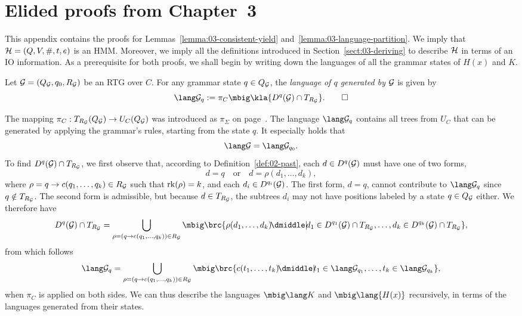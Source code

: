 \section{Elided proofs from Chapter~3}\label{sec:appendix-hk-proofs}

This appendix contains the proofs for Lemmas~\ref{lemma:03-consistent-yield}
and~\ref{lemma:03-language-partition}. We imply that $\mathcal H = (Q,V,\#,t,e)$ is an
HMM. Moreover, we imply all the definitions introduced in
Section~\ref{sect:03-deriving} to describe $\mathcal H$ in terms of an IO information.
As a prerequisite for both proofs, we shall begin by writing down the languages
of all the grammar states of $H(x)$ and $K$.

\begin{definition}
 Let $\mathcal G = (Q_\mathcal G,q_0,R_\mathcal G)$ be an RTG over $C$. For any grammar state $q\in
 Q_\mathcal G$, the \emph{language of $q$ generated by $\mathcal G$} is given by
 \[
  \lang\ug_q := \pi_C\mbig\kla{D^q(\ug)\cap T_{R_\ug}}.
  \qedhere
 \]
\end{definition}

The mapping $\pi_C:T_{R_\mathcal G}(Q_\mathcal G)\to U_C(Q_\mathcal G)$ was introduced as $\pi_\Sigma$ on
page~\pageref{def:02-pi-sigma}. The language $\lang\ug_q$ contains all trees
from $U_C$ that can be generated by applying the grammar's rules, starting from
the state $q$. It especially holds that
\begin{equation}\label{eq:a1}
 \lang\ug = \lang\ug_{q_0}.
\end{equation}
To find $D^q(\mathcal G)\cap T_{R_\mathcal G}$, we first observe that, according to
Definition~\ref{def:02-past}, each $d\in D^q(\mathcal G)$ must have one of two forms,
\[
 d = q \quad\text{or}\quad d = \rho(d_1,\ldots,d_k),
\]
where $\rho=q\to c(q_1,\ldots,q_k)\in R_\mathcal G$ such that $\operatorname{rk}(\rho) = k$, and
each $d_i\in D^{q_i}(\mathcal G)$. The first form, $d = q$, cannot contribute to
$\lang\ug_q$ since $q\notin T_{R_\mathcal G}$. The second form is admissible, but
because $d\in T_{R_\mathcal G}$, the subtrees $d_i$ may not have positions labeled by
a state $q\in Q_\mathcal G$ either. We therefore have
\[
 D^q(\ug)\cap T_{R_\ug} = \bigcup_{\rho=(q\to c(q_1,\ldots,q_k))\in R_\ug}
 \mbig\brc{\rho(d_1,\ldots,d_k) \!\dmiddle|\! d_1\in D^{q_1}(\ug)\cap T_{R_\ug},\ldots, d_k\in D^{q_k}(\ug)\cap T_{R_\ug}},
\]
from which follows
\begin{equation}
 \label{eq:a2}
 \lang\ug_q = \bigcup_{\rho=(q\to c(q_1,\ldots,q_k))\in R_\ug}
 \mbig\brc{c(t_1,\ldots,t_k) \!\dmiddle|\! t_1\in\lang\ug_{q_1},\ldots, t_k\in\lang\ug_{q_k}},
\end{equation}
when $\pi_C$ is applied on both sides. We can thus describe the languages
$\mbig\lang K$ and $\mbig\lang{H(x)}$ recursively, in terms of the languages
generated from their states.

